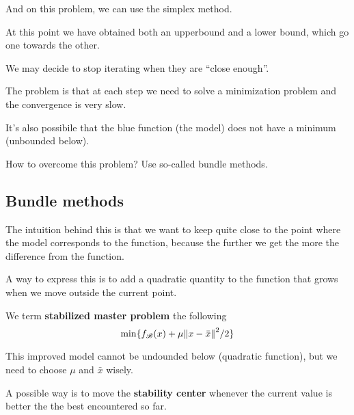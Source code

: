 \documentclass[ComputationalMathematics.tex]{subfiles}
\begin{document}
And on this problem, we can use the simplex method.


At this point we have obtained both an upperbound and a lower bound, which go one towards the other.

We may decide to stop iterating when they are ``close enough''.

The problem is that at each step we need to solve a minimization problem and the convergence is very slow.

It's also possibile that the blue function (the model) does not have a minimum (unbounded below).

How to overcome this problem? Use so-called bundle methods.

\subsection{Bundle methods}

The intuition behind this is that we want to keep quite close to the point where the model corresponds to the function, because the further we get the more the difference from the function.

A way to express this is to add a quadratic quantity to the function
that grows when we move outside the current point.

\begin{definition}
  We term \textbf{stabilized master problem} the following
  \[
    \min \{f_{\mathscr{B}}(x) + \mu {\left\lVert x - \bar{x}\right\rVert}^2 / 2\}
  \]
\end{definition}

 This improved model cannot be undounded below (quadratic function), but we need to choose $\mu$ and $\bar{x}$ wisely.

 A possible way is to move the \textbf{stability center} whenever the current value is better the the best encountered so far.

\end{document}
